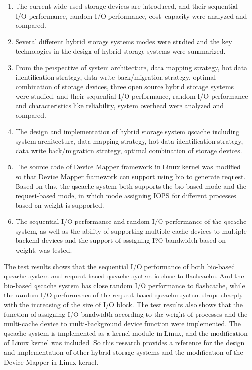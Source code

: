 \begin{englishabstract}
\begin{enumerate}[leftmargin=0pt, itemindent=39pt]
    \item The current wide-used storage devices are introduced, and their sequential I/O performance, random I/O performance, cost, capacity were analyzed and compared.
    \item Several different hybrid storage systems modes were studied and the key technologies in the design of hybrid storage systems were summarized.
    \item From the perspective of system architecture, data mapping strategy, hot data identification strategy, data write back/migration strategy, optimal combination of storage devices, three open source hybrid storage systems were studied, and their sequential I/O performance, random I/O performance and characteristics like reliability, system overhead were analyzed and compared.
    \item The design and implementation of hybrid storage system qscache including system architecture, data mapping strategy, hot data identification strategy, data write back/migration strategy, optimal combination of storage devices.
    \item The source code of Device Mapper framework in Linux kernel was modified so that Device Mapper framework can support using bio to generate request. Based on this, the qscache system both supports the bio-based mode and the request-based mode, in which mode assigning IOPS for different processes based on weight is supported.
    \item The sequential I/O performance and random I/O performance of the qscache system, as well as the ability of supporting multiple cache devices to multiple backend devices and the support of assigning I?O bandwidth based on weight, was tested.
\end{enumerate}

The test results shows that the sequential I/O performance of both bio-based qscache system and request-based qscache system is close to flashcache. And the bio-based qscache system has close random I/O performance to flashcache, while the random I/O performance of the request-based qscache system drops sharply with the increasing of the size of I/O block. The test results also shows that the function of assigning I/O bandwidth according to the weight of processes and the multi-cache device to multi-background device function were implemented. The qscache system is implemented as a kernel module in Linux, and the modification of Linux kernel was included. So this research provides a reference for the design and implementation of other hybrid storage systems and the modification of the Device Mapper in Linux kernel.

\end{englishabstract}

